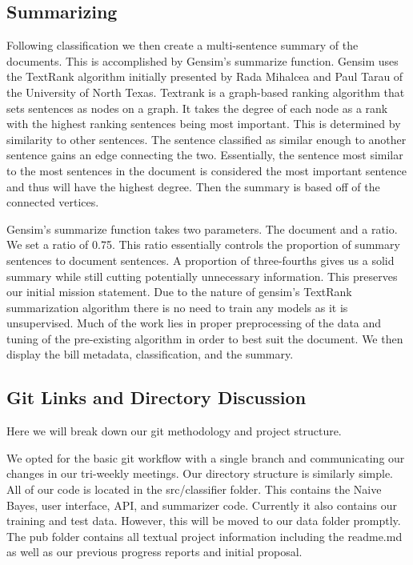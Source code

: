 \documentclass[11pt,a4paper]{article}
\begin{document}
\subsection{Summarizing}
Following classification we then create a multi-sentence summary of the documents. This is accomplished by Gensim’s summarize function. Gensim uses the TextRank algorithm initially presented by Rada Mihalcea and Paul Tarau of the University of North Texas. 
\newline\indent Textrank is a graph-based ranking algorithm that sets sentences as nodes on a graph. It takes the degree of each node as a rank with the highest ranking sentences being most important. This is determined by similarity to other sentences. The sentence classified as similar enough to another sentence gains an edge connecting the two. Essentially, the sentence most similar to the most sentences in the document is considered the most important sentence and thus will have the highest degree. Then the summary is based off of the connected vertices. 

Gensim's summarize function takes two parameters. The document and a ratio. We set a ratio of 0.75. This ratio essentially controls the proportion of summary sentences to document sentences. A proportion of three-fourths gives us a solid summary while still cutting potentially unnecessary information. This preserves our initial mission statement. Due to the nature of gensim’s TextRank summarization algorithm there is no need to train any models as it is unsupervised. Much of the work lies in proper preprocessing of the data and tuning of the pre-existing algorithm in order to best suit the document. We then display the bill metadata, classification, and the summary.

\subsection{Git Links and Directory Discussion}
Here we will break down our git methodology and project structure. 

We opted for the basic git workflow with a single branch and communicating our changes in our tri-weekly meetings. Our directory structure is similarly simple. All of our code is located in the src/classifier folder. This contains the Naive Bayes, user interface, API, and summarizer code. Currently it also contains our training and test data. However, this will be moved to our data folder promptly. The pub folder contains all textual project information including the readme.md as well as our previous progress reports and initial proposal. 
\end{document}
